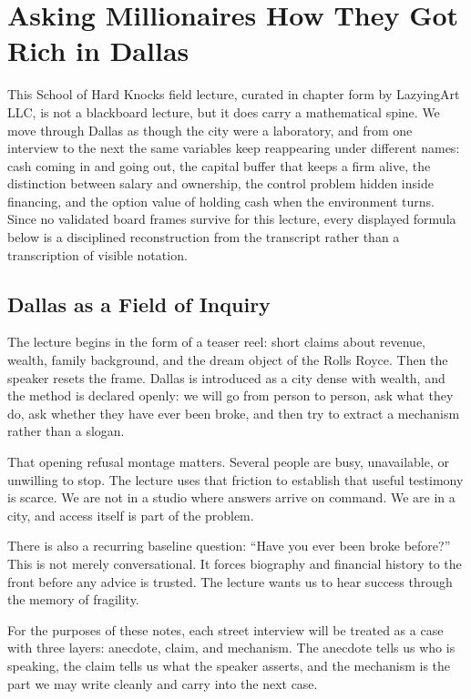\chapter{Asking Millionaires How They Got Rich in Dallas}

This School of Hard Knocks field lecture, curated in chapter form by LazyingArt LLC, is not a blackboard lecture, but it does carry a mathematical spine. We move through Dallas as though the city were a laboratory, and from one interview to the next the same variables keep reappearing under different names: cash coming in and going out, the capital buffer that keeps a firm alive, the distinction between salary and ownership, the control problem hidden inside financing, and the option value of holding cash when the environment turns. Since no validated board frames survive for this lecture, every displayed formula below is a disciplined reconstruction from the transcript rather than a transcription of visible notation.

\section{Dallas as a Field of Inquiry}

The lecture begins in the form of a teaser reel: short claims about revenue, wealth, family background, and the dream object of the Rolls Royce. Then the speaker resets the frame. Dallas is introduced as a city dense with wealth, and the method is declared openly: we will go from person to person, ask what they do, ask whether they have ever been broke, and then try to extract a mechanism rather than a slogan.

That opening refusal montage matters. Several people are busy, unavailable, or unwilling to stop. The lecture uses that friction to establish that useful testimony is scarce. We are not in a studio where answers arrive on command. We are in a city, and access itself is part of the problem.

There is also a recurring baseline question: ``Have you ever been broke before?'' This is not merely conversational. It forces biography and financial history to the front before any advice is trusted. The lecture wants us to hear success through the memory of fragility.

\begin{definition}
For the purposes of these notes, each street interview will be treated as a case with three layers: anecdote, claim, and mechanism. The anecdote tells us who is speaking, the claim tells us what the speaker asserts, and the mechanism is the part we may write cleanly and carry into the next case.
\end{definition}

